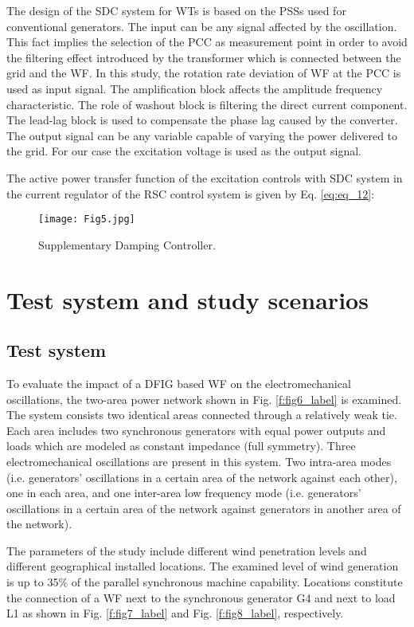 \documentclass[conference,11pt]{IEEEtran}
\begin{document}
The design of the SDC system for WTs is based on the PSSs used for conventional generators. The input can be any signal affected by the oscillation. This fact implies the selection of the PCC as measurement point in order to avoid the filtering effect introduced by the transformer which is connected between the grid and the WF. In this study, the rotation rate deviation  of WF at the PCC is used as input signal. The amplification block affects the amplitude frequency characteristic. The role of washout block is filtering the direct current component. The lead-lag block is used to compensate the phase lag caused by the converter. The output signal can be any variable capable of varying the power delivered to the grid. For our case the excitation voltage is used as the output signal. 

The active power transfer function of the excitation controls with SDC system in the current regulator of the RSC control system is given by Eq. \ref{eq:eq_12}:



\begin{figure}[t]
  \centering
  \texttt{[image: Fig5.jpg]}
  \caption{Supplementary Damping Controller.}
  \label{f:fig5_label}
\end{figure} 


\section{Test system and study scenarios}\label{s:system}


\subsection{Test system}\label{ss:test_system}
To evaluate the impact of a DFIG based WF on the electromechanical oscillations, the two-area power network shown in Fig. \ref{f:fig6_label} \cite{ref21} is examined. The system consists two identical areas connected through a relatively weak tie. Each area includes two synchronous generators with equal power outputs and loads which are modeled as constant impedance (full symmetry). Three electromechanical oscillations are present in this system. Two intra-area modes (i.e. generators' oscillations in a certain area of the network against each other), one in each area, and one inter-area low frequency mode (i.e. generators' oscillations in a certain area of the network against generators in another area of the network). 

The parameters of the study include different wind penetration levels and different geographical installed locations. The examined level of wind generation is up to 35\% of the parallel synchronous machine capability. Locations constitute the connection of a WF next to the synchronous generator G4 and next to load L1 as shown in Fig. \ref{f:fig7_label} and Fig. \ref{f:fig8_label}, respectively. 
\end{document}
